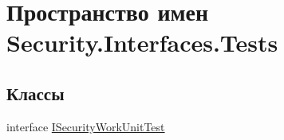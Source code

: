 \hypertarget{namespace_security_1_1_interfaces_1_1_tests}{}\section{Пространство имен Security.\+Interfaces.\+Tests}
\label{namespace_security_1_1_interfaces_1_1_tests}
\subsection*{Классы}
\begin{DoxyCompactItemize}
\item 
interface \hyperlink{interface_security_1_1_interfaces_1_1_tests_1_1_i_security_work_unit_test}{I\+Security\+Work\+Unit\+Test}
\end{DoxyCompactItemize}
